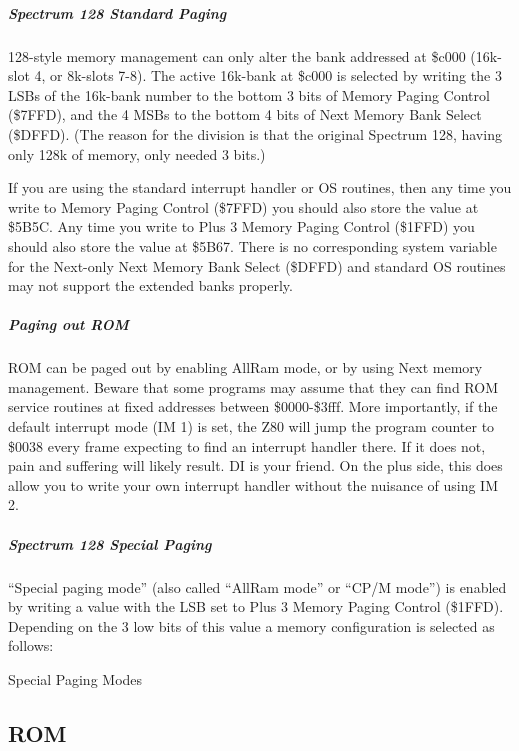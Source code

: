 



\subparagraph{Spectrum 128 Standard Paging}

128-style memory management can only alter the bank addressed at
\$c000 (16k-slot 4, or 8k-slots 7-8). The active 16k-bank at \$c000 is
selected by writing the 3 LSBs of the 16k-bank number to the bottom 3
bits of Memory Paging Control (\$7FFD), and the 4 MSBs to the bottom 4
bits of Next Memory Bank Select (\$DFFD). (The reason for the division
is that the original Spectrum 128, having only 128k of memory, only
needed 3 bits.)

If you are using the standard interrupt handler or OS routines, then
any time you write to Memory Paging Control (\$7FFD) you should also
store the value at \$5B5C. Any time you write to Plus 3 Memory Paging
Control (\$1FFD) you should also store the value at \$5B67. There is
no corresponding system variable for the Next-only Next Memory Bank
Select (\$DFFD) and standard OS routines may not support the extended
banks properly.

\subparagraph{Paging out ROM}

ROM can be paged out by enabling AllRam mode, or by using Next memory
management. Beware that some programs may assume that they can find
ROM service routines at fixed addresses between \$0000-\$3fff. More
importantly, if the default interrupt mode (IM 1) is set, the Z80 will
jump the program counter to \$0038 every frame expecting to find an
interrupt handler there. If it does not, pain and suffering will
likely result. DI is your friend. On the plus side, this does allow
you to write your own interrupt handler without the nuisance of using
IM 2.

\subparagraph{Spectrum 128 Special Paging}

``Special paging mode'' (also called ``AllRam mode'' or ``CP/M mode'')
is enabled by writing a value with the LSB set to Plus 3 Memory Paging
Control (\$1FFD). Depending on the 3 low bits of this value a memory
configuration is selected as follows:

\begin{table}[h]\centering
  \caption{Special Paging Modes}
\end{table}

\subsection{ROM}

